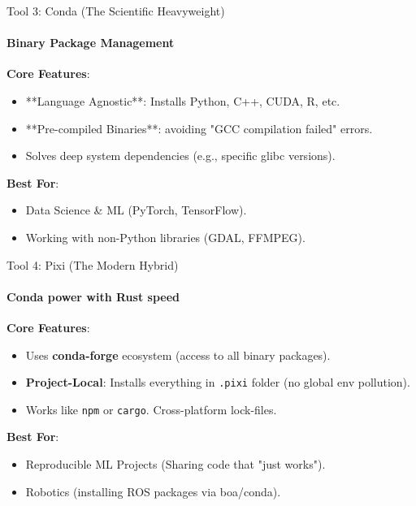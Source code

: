 \documentclass[aspectratio=169]{beamer}
\begin{document}
\begin{frame}[t]{Tool 3: Conda (The Scientific Heavyweight)}
    \framesubtitle{Binary Package Management}
            \textbf{Core Features}:
            \begin{itemize}
                \item **Language Agnostic**: Installs Python, C++, CUDA, R, etc.
                \item **Pre-compiled Binaries**: avoiding "GCC compilation failed" errors.
                \item Solves deep system dependencies (e.g., specific glibc versions).
            \end{itemize}
            
            \textbf{Best For}:
            \begin{itemize}
                \item Data Science \& ML (PyTorch, TensorFlow).
                \item Working with non-Python libraries (GDAL, FFMPEG).
            \end{itemize}
\end{frame}

\begin{frame}[t]{Tool 4: Pixi (The Modern Hybrid)}
    \framesubtitle{Conda power with Rust speed}
            \textbf{Core Features}:
            \begin{itemize}
                \item Uses \textbf{conda-forge} ecosystem (access to all binary packages).
                \item \textbf{Project-Local}: Installs everything in \texttt{.pixi} folder (no global env pollution).
                \item Works like \texttt{npm} or \texttt{cargo}. Cross-platform lock-files.
            \end{itemize}
            
            \textbf{Best For}:
            \begin{itemize}
                \item Reproducible ML Projects (Sharing code that "just works").
                \item Robotics (installing ROS packages via boa/conda).
            \end{itemize}
\end{frame}
\end{document}
